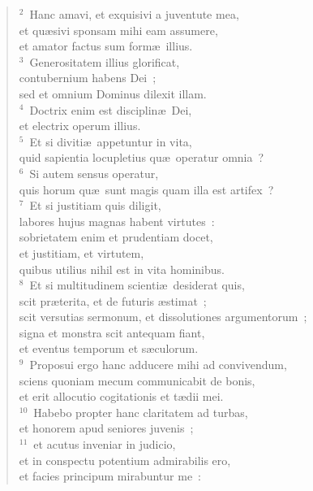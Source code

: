 \begin{flushleft}\begin{verse}\vspace{6pt}${}^{2}$~Hanc amavi, et exquisivi a juventute mea,\\ et qu\ae sivi sponsam mihi eam assumere,\\ et amator factus sum form\ae\ illius.\\
${}^{3}$~Generositatem illius glorificat,\\ contubernium habens Dei~;\\ sed et omnium Dominus dilexit illam.\\
${}^{4}$~Doctrix enim est disciplin\ae\ Dei,\\ et electrix operum illius.\\
${}^{5}$~Et si diviti\ae\ appetuntur in vita,\\ quid sapientia locupletius qu\ae\ operatur omnia~?\\
${}^{6}$~Si autem sensus operatur,\\ quis horum qu\ae\ sunt magis quam illa est artifex~?\\
${}^{7}$~Et si justitiam quis diligit,\\ labores hujus magnas habent virtutes~:\\ sobrietatem enim et prudentiam docet,\\ et justitiam, et virtutem,\\ quibus utilius nihil est in vita hominibus.\\
${}^{8}$~Et si multitudinem scienti\ae\ desiderat quis,\\ scit pr\ae terita, et de futuris \ae stimat~;\\ scit versutias sermonum, et dissolutiones argumentorum~;\\ signa et monstra scit antequam fiant,\\ et eventus temporum et s\ae culorum.\\
${}^{9}$~Proposui ergo hanc adducere mihi ad convivendum,\\ sciens quoniam mecum communicabit de bonis,\\ et erit allocutio cogitationis et t\ae dii mei.\\
${}^{10}$~Habebo propter hanc claritatem ad turbas,\\ et honorem apud seniores juvenis~;\\
${}^{11}$~et acutus inveniar in judicio,\\ et in conspectu potentium admirabilis ero,\\ et facies principum mirabuntur me~:\\

\end{verse}
\end{flushleft}
